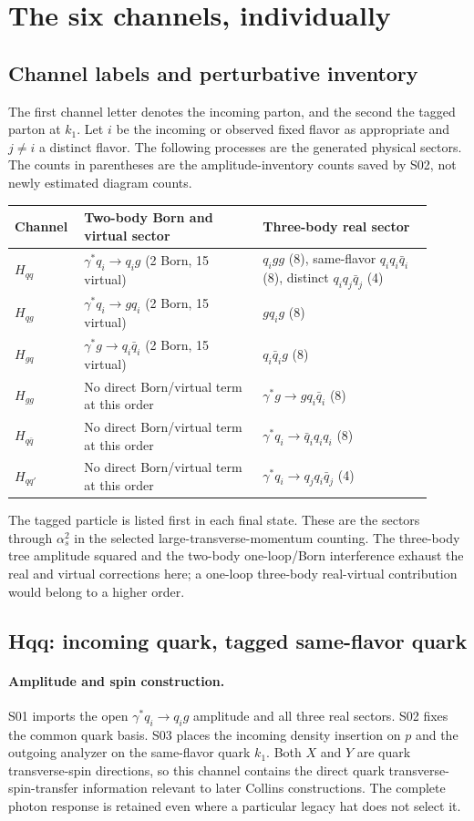 \documentclass[11pt,a4paper]{article}
\newcommand{\as}{\alpha_s}
\begin{document}
\section{The six channels, individually}
\subsection{Channel labels and perturbative inventory}
The first channel letter denotes the incoming parton, and the second the tagged parton at $k_1$. Let $i$ be the incoming or observed fixed flavor as appropriate and $j\ne i$ a distinct flavor. The following processes are the generated physical sectors. The counts in parentheses are the amplitude-inventory counts saved by S02, not newly estimated diagram counts.
\begin{longtable}{p{0.13\linewidth}p{0.40\linewidth}p{0.38\linewidth}}
\toprule Channel & Two-body Born and virtual sector & Three-body real sector\\\midrule
$H_{qq}$ & $\gamma^*q_i\to q_i g$ (2 Born, 15 virtual) & $q_i gg$ (8), same-flavor $q_iq_i\bar q_i$ (8), distinct $q_iq_j\bar q_j$ (4)\\
$H_{qg}$ & $\gamma^*q_i\to gq_i$ (2 Born, 15 virtual) & $gq_i g$ (8)\\
$H_{gq}$ & $\gamma^*g\to q_i\bar q_i$ (2 Born, 15 virtual) & $q_i\bar q_i g$ (8)\\
$H_{gg}$ & No direct Born/virtual term at this order & $\gamma^*g\to gq_i\bar q_i$ (8)\\
$H_{q\bar q}$ & No direct Born/virtual term at this order & $\gamma^*q_i\to\bar q_i q_i q_i$ (8)\\
$H_{qq'}$ & No direct Born/virtual term at this order & $\gamma^*q_i\to q_j q_i\bar q_j$ (4)\\\bottomrule
\end{longtable}
The tagged particle is listed first in each final state. These are the sectors through $\as^2$ in the selected large-transverse-momentum counting. The three-body tree amplitude squared and the two-body one-loop/Born interference exhaust the real and virtual corrections here; a one-loop three-body real-virtual contribution would belong to a higher order.

\subsection{Hqq: incoming quark, tagged same-flavor quark}
\paragraph{Amplitude and spin construction.}
S01 imports the open $\gamma^*q_i\to q_i g$ amplitude and all three real sectors. S02 fixes the common quark basis. S03 places the incoming density insertion on $p$ and the outgoing analyzer on the same-flavor quark $k_1$. Both $X$ and $Y$ are quark transverse-spin directions, so this channel contains the direct quark transverse-spin-transfer information relevant to later Collins constructions. The complete photon response is retained even where a particular legacy hat does not select it.
\end{document}
